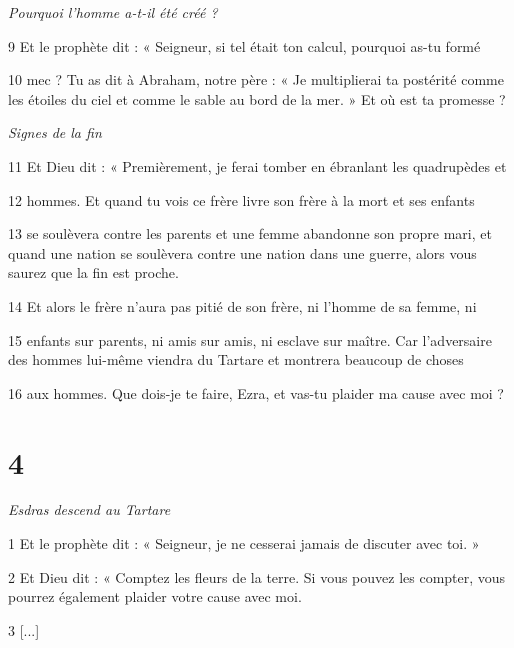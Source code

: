 \par \textit{Pourquoi l'homme a-t-il été créé ?}

\par 9 Et le prophète dit : « Seigneur, si tel était ton calcul, pourquoi as-tu formé

\par 10 mec ? Tu as dit à Abraham, notre père : « Je multiplierai ta postérité comme les étoiles du ciel et comme le sable au bord de la mer. » Et où est ta promesse ?

\par \textit{Signes de la fin}

\par 11 Et Dieu dit : « Premièrement, je ferai tomber en ébranlant les quadrupèdes et

\par 12 hommes. Et quand tu vois ce frère livre son frère à la mort et ses enfants

\par 13 se soulèvera contre les parents et une femme abandonne son propre mari, et quand une nation se soulèvera contre une nation dans une guerre, alors vous saurez que la fin est proche.

\par 14 Et alors le frère n'aura pas pitié de son frère, ni l'homme de sa femme, ni

\par 15 enfants sur parents, ni amis sur amis, ni esclave sur maître. Car l'adversaire des hommes lui-même viendra du Tartare et montrera beaucoup de choses

\par 16 aux hommes. Que dois-je te faire, Ezra, et vas-tu plaider ma cause avec moi ?

\chapter{4}

\par \textit{Esdras descend au Tartare}

\par 1 Et le prophète dit : « Seigneur, je ne cesserai jamais de discuter avec toi. »

\par 2 Et Dieu dit : « Comptez les fleurs de la terre. Si vous pouvez les compter, vous pourrez également plaider votre cause avec moi.

\par 3 [...]

